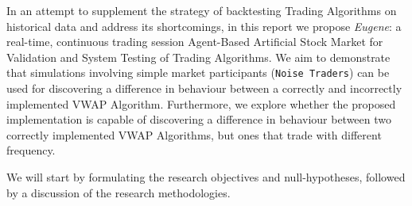 In an attempt to supplement the strategy of backtesting Trading Algorithms on historical data and address its shortcomings, in this report we propose \emph{Eugene}: a real-time, continuous trading session Agent-Based Artificial Stock Market for Validation and System Testing of Trading Algorithms. We aim to demonstrate that simulations involving simple market participants (\texttt{Noise Traders}) can be used for discovering a difference in behaviour between a correctly and incorrectly implemented VWAP Algorithm. Furthermore, we explore whether the proposed implementation is capable of discovering a difference in behaviour between two correctly implemented VWAP Algorithms, but ones that trade with different frequency.

We will start by formulating the research objectives and null-hypotheses, followed by a discussion of the research methodologies.




